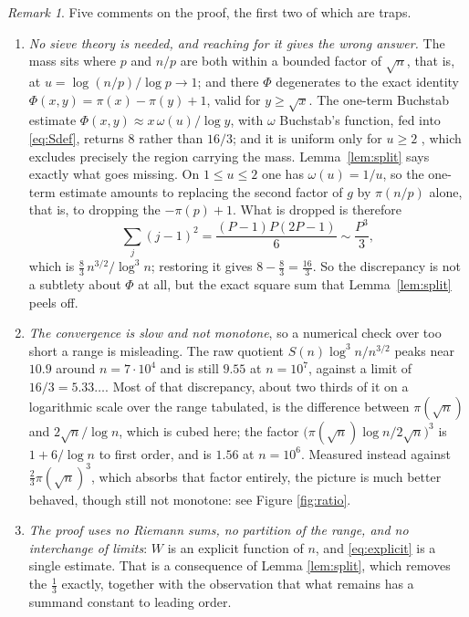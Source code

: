 \documentclass[a4paper,11pt,oneside,reqno]{amsart}
\theoremstyle{definition}
\theoremstyle{remark}
\newtheorem{remark}[definition]{Remark}
\theoremstyle{plain}
\begin{document}
\begin{remark}\label{rem:hypotheses}
  Five comments on the proof, the first two of which are traps.

  \begin{enumerate}
    \item \emph{No sieve theory is needed, and reaching for it gives the wrong
      answer.} The mass sits where \(p\) and \(n/p\) are both within a bounded
      factor of \(\sqrt n\), that is, at \(u = \log(n/p)/\log p \to 1\); and there
      \(\Phi\) degenerates to the exact identity \(\Phi(x,y) = \pi(x)-\pi(y)+1\),
      valid for \(y \ge \sqrt x\). The one-term Buchstab estimate
      \(\Phi(x,y) \approx x\,\omega(u)/\log y\), with \(\omega\) Buchstab's
      function, fed into \eqref{eq:Sdef}, returns \(8\) rather than \(16/3\);
      and it is uniform only for \(u \ge 2\) \cite{Fan}, which excludes precisely
      the region carrying the mass. Lemma~\ref{lem:split} says exactly what goes
      missing. On \(1 \le u \le 2\) one has \(\omega(u) = 1/u\), so the one-term
      estimate amounts to replacing the second factor of \(g\) by \(\pi(n/p)\)
      alone, that is, to dropping the \(-\pi(p)+1\). What is dropped is
      therefore
      \[
        \sum_j(j-1)^{2} = \frac{(P-1)P(2P-1)}{6} \sim \frac{P^{3}}{3},
      \]
      which is
      \(\tfrac{8}{3}\,n^{3/2}/\log^{3}n\); restoring it gives
      \(8-\tfrac{8}{3} = \tfrac{16}3\). So the discrepancy is not a subtlety about
      \(\Phi\) at all, but the exact square sum that Lemma~\ref{lem:split}
      peels off.

    \item \emph{The convergence is slow and not monotone}, so a numerical check
      over too short a range is misleading. The raw quotient
      \(S(n)\log^{3}n/n^{3/2}\) peaks near \(10.9\) around \(n = 7 \cdot 10^{4}\)
      and is still \(9.55\) at \(n = 10^{7}\), against a limit of
      \(16/3 = 5.33\dots\). Most of that discrepancy, about two thirds of it on a
      logarithmic scale over the range tabulated, is the difference between
      \(\pi(\sqrt n)\) and \(2\sqrt n/\log n\), which is cubed here; the factor
      \(\bigl(\pi(\sqrt n)\log n/2\sqrt n\bigr)^{3}\) is \(1+6/\log n\) to first
      order, and is \(1.56\) at \(n = 10^{6}\). Measured instead against
      \(\tfrac{2}{3}\pi(\sqrt n)^{3}\), which absorbs that factor entirely, the
      picture is much better behaved, though still not monotone: see Figure
      \ref{fig:ratio}.

    \item \emph{The proof uses no Riemann sums, no partition of the range, and
      no interchange of limits}: \(W\) is an explicit function of \(n\), and
      \eqref{eq:explicit} is a single estimate. That is a consequence of Lemma
      \ref{lem:split}, which removes the \(\tfrac{1}{3}\) exactly, together with the
      observation that what remains has a summand constant to leading order.


\end{enumerate}
\end{remark}
\end{document}
